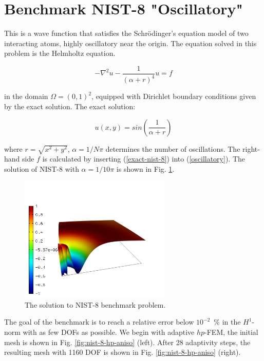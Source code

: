 \section{Benchmark NIST-8 "Oscillatory"}
\label{sec:bench-8}

This is a wave function that satisfies the Schr\"{o}dinger's equation model of two
interacting atoms, highly oscillatory near the origin.
The equation solved in this problem is the Helmholtz equation.

\begin{equation} \label{oscillatory}
-\nabla^{2} u - \frac{1}{(\alpha + r)^{4}} u = f
\end{equation}

in the domain $\Omega = (0, 1)^2$, equipped with Dirichlet boundary conditions
given by the exact solution. The exact solution:

\begin{equation}\label{exact-nist-8}
u(x,y) = sin(\frac{1}{\alpha + r})
\end{equation}

where $r = \sqrt{x^{2} + y^{2}}$, $\alpha = 1 / N \pi$ determines the number of oscillations.
The right-hand side $f$ is calculated by inserting (\ref{exact-nist-8}) into (\ref{oscillatory}).
The solution of NIST-8 with $\alpha = 1 / 10 \pi$ is shown in Fig. \ref{fig:sln-nist08}.

\begin{figure}[!ht]
\centering
\includegraphics[height=6cm]{nist/nist-8/solution.png}
\caption{The solution to NIST-8 benchmark problem.}
\label{fig:sln-nist08}
\end{figure}

The goal of the benchmark is to reach a relative error below
$10^{-2}$~\% in the $H^1$-norm with as few DOFs as possible.
We begin with adaptive $hp$-FEM,
the initial mesh is shown in Fig. \ref{fig:nist-8-hp-aniso} (left).
After 28 adaptivity steps, the resulting mesh with 1160 DOF is shown
in Fig. \ref{fig:nist-8-hp-aniso} (right).


